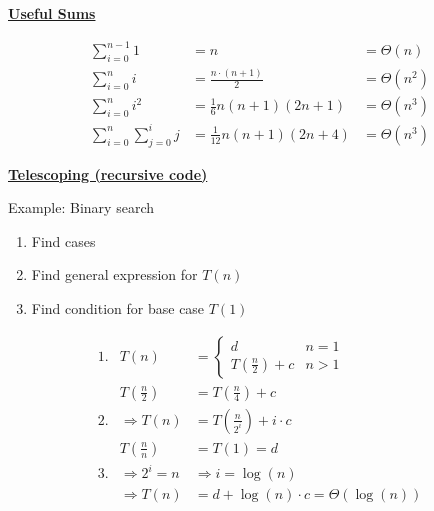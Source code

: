         {\centering\underline{\textbf{Useful Sums}} \par}
        \begin{align*}
            \sum_{i = 0}^{n-1} 1                &= n                            &= \Theta(n)\\
            \sum_{i = 0}^{n} i                  &= \frac{n \cdot (n + 1)}{2}    &= \Theta(n^2)\\
            \sum_{i = 0}^{n} i^2                &= \frac{1}{6} n (n+1) (2n + 1) &= \Theta(n^3)\\
            \sum_{i = 0}^{n} \sum_{j = 0}^{i} j &= \frac{1}{12} n (n+1) (2n +4) &= \Theta(n^3)
        \end{align*}

        {\centering\underline{\textbf{Telescoping (recursive code)}} \par}
            Example: Binary search\\
            \begin{enumerate}
                \item Find cases
                \item Find general expression for $T(n)$
                \item Find condition for base case $T(1)$
            \end{enumerate}
            \begin{align*}
                1. & T(n) &= 
                \begin{cases}
                    d                               & n = 1\\
                    T\left(\frac{n}{2}\right) + c   & n > 1
                \end{cases}\\
                 & T(\frac{n}{2}) &= T(\frac{n}{4}) + c\\
                2. & \Rightarrow T(n) &= T(\frac{n}{2^i}) + i \cdot c\\
                 & T(\frac{n}{n}) &= T(1) = d\\
                3. & \Rightarrow 2^i = n &\Rightarrow i = \log(n)\\
                 & \Rightarrow T(n) &= d + \log(n) \cdot c = \Theta(\log(n)) 
            \end{align*}